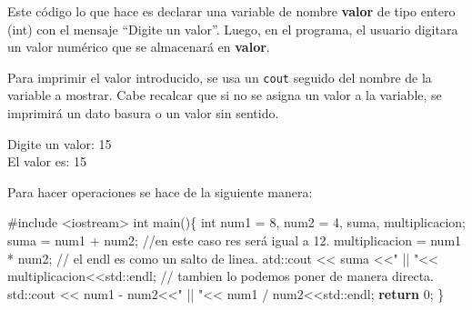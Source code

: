 \documentclass[
  11pt,
  a4paper,
  DIV=11,
  numbers=noendperiod]{scrreprt}
\newenvironment{Shaded}{\begin{snugshade}}{\end{snugshade}}
\newcommand{\BuiltInTok}[1]{\textcolor[rgb]{0.00,0.23,0.31}{#1}}
\newcommand{\CommentTok}[1]{\textcolor[rgb]{0.37,0.37,0.37}{#1}}
\newcommand{\ControlFlowTok}[1]{\textcolor[rgb]{0.00,0.23,0.31}{\textbf{#1}}}
\newcommand{\DataTypeTok}[1]{\textcolor[rgb]{0.68,0.00,0.00}{#1}}
\newcommand{\DecValTok}[1]{\textcolor[rgb]{0.68,0.00,0.00}{#1}}
\newcommand{\ImportTok}[1]{\textcolor[rgb]{0.00,0.46,0.62}{#1}}
\newcommand{\NormalTok}[1]{\textcolor[rgb]{0.00,0.23,0.31}{#1}}
\newcommand{\OperatorTok}[1]{\textcolor[rgb]{0.37,0.37,0.37}{#1}}
\newcommand{\PreprocessorTok}[1]{\textcolor[rgb]{0.68,0.00,0.00}{#1}}
\newcommand{\StringTok}[1]{\textcolor[rgb]{0.13,0.47,0.30}{#1}}
\begin{document}
Este código lo que hace es declarar una variable de nombre
\textbf{valor} de tipo entero (int) con el mensaje ``Digite un valor''.
Luego, en el programa, el usuario digitara un valor numérico que se
almacenará en \textbf{valor}.

Para imprimir el valor introducido, se usa un \texttt{cout} seguido del
nombre de la variable a mostrar. Cabe recalcar que si no se asigna un
valor a la variable, se imprimirá un dato basura o un valor sin sentido.

\begin{tcolorbox}[custombox]
Digite un valor: 15\\
El valor es: 15
\end{tcolorbox}

Para hacer operaciones se hace de la siguiente manera:

\begin{Shaded}
\begin{Highlighting}[]
\PreprocessorTok{\#include }\ImportTok{\textless{}iostream\textgreater{}}
\DataTypeTok{int}\NormalTok{ main}\OperatorTok{()\{}
    \DataTypeTok{int}\NormalTok{ num1 }\OperatorTok{=} \DecValTok{8}\OperatorTok{,}\NormalTok{ num2 }\OperatorTok{=} \DecValTok{4}\OperatorTok{,}\NormalTok{ suma}\OperatorTok{,}\NormalTok{ multiplicacion}\OperatorTok{;}
\NormalTok{    suma }\OperatorTok{=}\NormalTok{ num1 }\OperatorTok{+}\NormalTok{ num2}\OperatorTok{;}  \CommentTok{//en este caso res será igual a 12.}
\NormalTok{    multiplicacion }\OperatorTok{=}\NormalTok{ num1 }\OperatorTok{*}\NormalTok{ num2}\OperatorTok{;}
    \CommentTok{// el endl es como un salto de linea.}
\NormalTok{    atd}\OperatorTok{::}\NormalTok{cout }\OperatorTok{\textless{}\textless{}}\NormalTok{ suma }\OperatorTok{\textless{}\textless{}}\StringTok{" || "}\OperatorTok{\textless{}\textless{}}\NormalTok{ multiplicacion}\OperatorTok{\textless{}\textless{}}\BuiltInTok{std::}\NormalTok{endl}\OperatorTok{;} 
    \CommentTok{// tambien lo podemos poner de manera directa.}
    \BuiltInTok{std::}\NormalTok{cout }\OperatorTok{\textless{}\textless{}}\NormalTok{ num1 }\OperatorTok{{-}}\NormalTok{ num2}\OperatorTok{\textless{}\textless{}}\StringTok{"  || "}\OperatorTok{\textless{}\textless{}}\NormalTok{ num1 }\OperatorTok{/}\NormalTok{ num2}\OperatorTok{\textless{}\textless{}}\BuiltInTok{std::}\NormalTok{endl}\OperatorTok{;}
    \ControlFlowTok{return} \DecValTok{0}\OperatorTok{;}
\OperatorTok{\}}
\end{Highlighting}
\end{Shaded}
\end{document}
